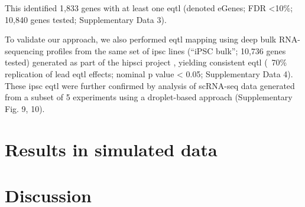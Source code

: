 This identified 1,833 genes with at least one \gls{eqtl} (denoted eGenes; FDR <10\%; 10,840 genes tested; Supplementary Data 3). 


To validate our approach, we also performed \gls{eqtl} mapping using deep bulk RNA-sequencing profiles from the same set of \gls{ipsc} lines (“iPSC bulk”; 10,736 genes tested) generated as part of the \gls{hipsci} project \cite{kilpinen2017common}, yielding consistent \gls{eqtl} (~70\% replication of lead \gls{eqtl} effects; nominal p value < 0.05; Supplementary Data 4).\\ 

These \gls{ipsc} \gls{eqtl} were further confirmed by analysis of scRNA-seq data generated from a subset of 5 experiments using a droplet-based approach (Supplementary Fig. 9, 10).


\section{Results in simulated data}

\section{Discussion}

